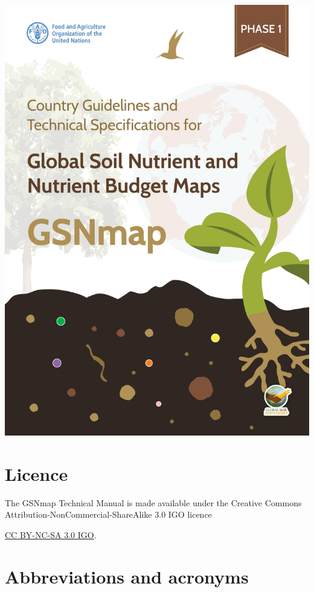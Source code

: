 \documentclass[
  10pt,
  b5paper,
  oneside]{book}
\begin{document}
\includegraphics{images/frontcover.jpg}

\hypertarget{licence}{%
\chapter*{Licence}\label{licence}}

The GSNmap Technical Manual is made available under the Creative Commons Attribution-NonCommercial-ShareAlike 3.0 IGO licence

\href{https://creativecommons.org/licenses/by-nc-sa/3.0/igo/legalcode}{CC BY-NC-SA 3.0 IGO}.

\hypertarget{abbreviations-and-acronyms}{%
\chapter*{Abbreviations and acronyms}\label{abbreviations-and-acronyms}}
\end{document}
